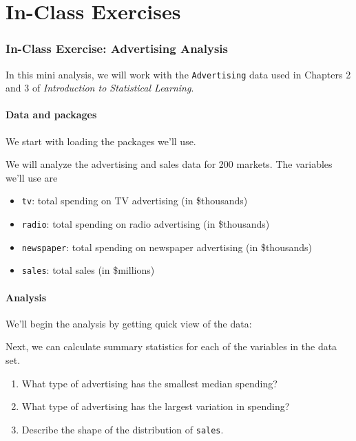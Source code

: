 \documentclass[]{book}
\providecommand{\tightlist}{%
  \setlength{\itemsep}{0pt}\setlength{\parskip}{0pt}}
\begin{document}
\part*{In-Class Exercises}\label{part-in-class-exercises}

\section{In-Class Exercise: Advertising
Analysis}\label{in-class-exercise-advertising-analysis}

In this mini analysis, we will work with the \texttt{Advertising} data
used in Chapters 2 and 3 of \emph{Introduction to Statistical Learning}.

\subsection{Data and packages}\label{data-and-packages}

We start with loading the packages we'll use.

We will analyze the advertising and sales data for 200 markets. The
variables we'll use are

\begin{itemize}
\tightlist
\item
  \texttt{tv}: total spending on TV advertising (in \$thousands)
\item
  \texttt{radio}: total spending on radio advertising (in \$thousands)
\item
  \texttt{newspaper}: total spending on newspaper advertising (in
  \$thousands)
\item
  \texttt{sales}: total sales (in \$millions)
\end{itemize}

\subsection{Analysis}\label{analysis}

We'll begin the analysis by getting quick view of the data:

Next, we can calculate summary statistics for each of the variables in
the data set.

\begin{enumerate}
\def\labelenumi{\arabic{enumi}.}
\item
  What type of advertising has the smallest median spending?
\item
  What type of advertising has the largest variation in spending?
\item
  Describe the shape of the distribution of \texttt{sales}.
\end{enumerate}
\end{document}
